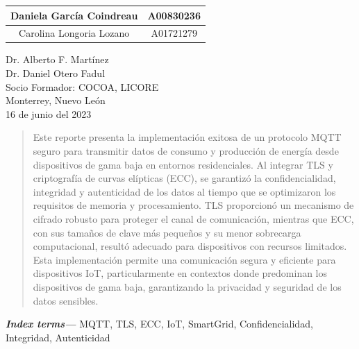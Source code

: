 \documentclass{article}
\providecommand{\keywords}[1]{\textbf{\textit{Index terms---}} #1}
\begin{document}
\begin{titlepage}
\begin{center}
\begin{table}[h!]
\begin{tabular}{ ||c|c|| }
                    \hline
                    Daniela García Coindreau & A00830236 \\
                    \hline
                    Carolina Longoria Lozano & A01721279 \\
                    \hline
                \end{tabular}
            \end{table}
            \vspace{0.7cm}
            \large 	Dr. Alberto F. Martínez \\ %
            \vspace{0.2cm}
            \large 	Dr. Daniel Otero Fadul\\ %
            \vspace{0.2cm}
            \large Socio Formador: COCOA, LICORE \\
            \vspace{0.2cm}
            \large Monterrey, Nuevo León \\
            \vspace{0.2cm}
            \large 16 de junio del 2023 \\
            \vspace{1cm}
        \end{center}
    \end{titlepage}

    \tableofcontents
    \listoffigures
    \listoftables
    \clearpage
    \renewcommand{\tablename}{Tabla}

    \begin{abstract}
        Este reporte presenta la implementación exitosa de un protocolo MQTT seguro para transmitir datos de consumo y producción de energía desde dispositivos de gama baja en entornos residenciales. Al integrar TLS y criptografía de curvas elípticas (ECC), se garantizó la confidencialidad, integridad y autenticidad de los datos al tiempo que se optimizaron los requisitos de memoria y procesamiento. TLS proporcionó un mecanismo de cifrado robusto para proteger el canal de comunicación, mientras que ECC, con sus tamaños de clave más pequeños y su menor sobrecarga computacional, resultó adecuado para dispositivos con recursos limitados. Esta implementación permite una comunicación segura y eficiente para dispositivos IoT, particularmente en contextos donde predominan los dispositivos de gama baja, garantizando la privacidad y seguridad de los datos sensibles.
    \end{abstract}
    \keywords{MQTT, TLS, ECC, IoT, SmartGrid, Confidencialidad, Integridad, Autenticidad}
\end{document}
